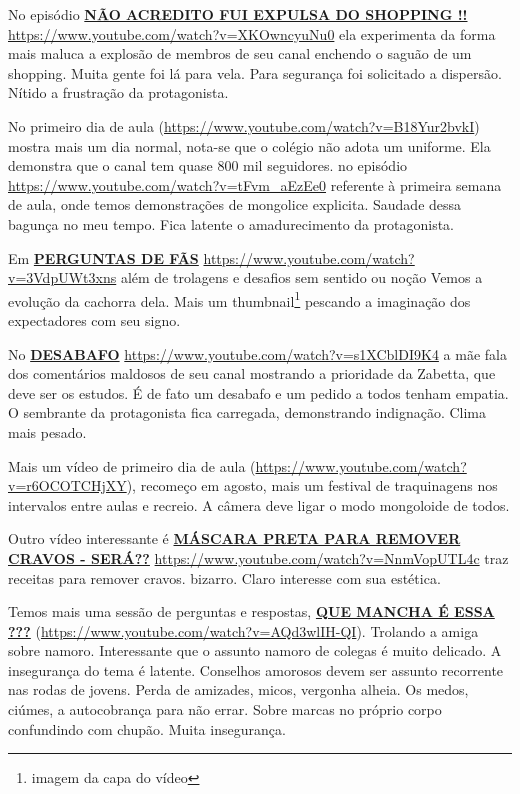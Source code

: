 No episódio \href{https://www.youtube.com/watch?v=XKOwncyuNu0}{\textbf{NÃO ACREDITO FUI EXPULSA DO SHOPPING !!}} \url{https://www.youtube.com/watch?v=XKOwncyuNu0} ela experimenta da forma mais maluca a explosão de membros de seu canal enchendo o saguão de um shopping. Muita gente foi lá para vela. Para segurança foi solicitado a dispersão. Nítido a frustração da protagonista.

No primeiro dia de aula (\url{https://www.youtube.com/watch?v=B18Yur2bvkI}) mostra mais um dia normal, nota-se que o colégio não adota um uniforme. Ela demonstra que o canal tem quase 800 mil seguidores. no episódio \url{https://www.youtube.com/watch?v=tFvm_aEzEe0} referente à primeira semana de aula, onde temos demonstrações de mongolice explicita. Saudade dessa bagunça no meu tempo. Fica latente o amadurecimento da protagonista.

Em \href{https://www.youtube.com/watch?v=3VdpUWt3xns}{\textbf{PERGUNTAS DE FÃS}} \url{https://www.youtube.com/watch?v=3VdpUWt3xns} além de trolagens e desafios sem sentido ou noção Vemos a evolução da cachorra dela. Mais um thumbnail\footnote{imagem da capa do vídeo} pescando a imaginação dos expectadores com seu signo.

No \href{https://www.youtube.com/watch?v=s1XCblDI9K4}{\textbf{DESABAFO}} \url{https://www.youtube.com/watch?v=s1XCblDI9K4} a mãe fala dos comentários maldosos de seu canal mostrando a prioridade da Zabetta, que deve ser os estudos. É de fato um desabafo e um pedido a todos tenham empatia. O sembrante da protagonista fica carregada, demonstrando indignação. Clima mais pesado.

Mais um vídeo de primeiro dia de aula (\url{https://www.youtube.com/watch?v=r6OCOTCHjXY}), recomeço em agosto, mais um festival de traquinagens nos intervalos entre aulas e recreio. A câmera deve ligar o modo mongoloide de todos.

Outro vídeo interessante é \href{https://www.youtube.com/watch?v=NnmVopUTL4c}{\textbf{MÁSCARA PRETA PARA REMOVER CRAVOS - SERÁ??}} \url{https://www.youtube.com/watch?v=NnmVopUTL4c} traz receitas para remover cravos. bizarro. Claro interesse com sua estética.

Temos mais uma sessão de perguntas e respostas, \href{https://www.youtube.com/watch?v=AQd3wlIH-QI}{\textbf{QUE MANCHA É ESSA ???}} (\url{https://www.youtube.com/watch?v=AQd3wlIH-QI}). Trolando a amiga sobre namoro. Interessante que o assunto namoro de colegas é muito delicado. A insegurança do tema é latente. Conselhos amorosos devem ser assunto recorrente nas rodas de jovens. Perda de amizades, micos, vergonha alheia. Os medos, ciúmes, a autocobrança para não errar. Sobre marcas no próprio corpo confundindo com chupão. Muita insegurança.

